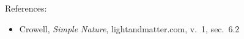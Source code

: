 References:
\begin{itemize}
\item Crowell, \emph{Simple Nature}, lightandmatter.com, v.~1, sec.~6.2
\end{itemize}
